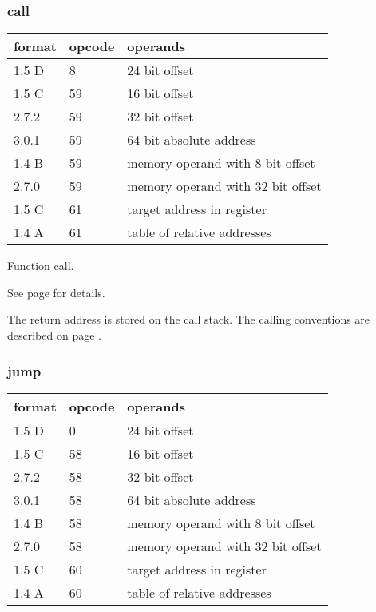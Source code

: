 \documentclass[forwardcom.tex]{subfiles}
\begin{document}
\subsubsection{call}
\label{table:callInstruction}
\begin{tabular}{|p{12mm}|p{12mm}|p{110mm}|}
\hline
\bfseries format & \bfseries opcode & \bfseries operands \\ \hline
1.5 D &  8 & 24 bit offset \\ \hline
1.5 C & 59 & 16 bit offset \\ \hline
2.7.2 & 59 & 32 bit offset \\ \hline
3.0.1 & 59 & 64 bit absolute address \\ \hline
1.4 B & 59 & memory operand with 8 bit offset \\ \hline
2.7.0 & 59 & memory operand with 32 bit offset \\ \hline
1.5 C & 61 & target address in register \\ \hline
1.4 A & 61 & table of relative addresses  \\ \hline
\end{tabular}
\vspace{2mm}

Function call.
\vspace{2mm}

See page \pageref{table:jumpInstructionFormats} for details.
\vspace{2mm}

The return address is stored on the call stack. The calling conventions are described on page \pageref{functionCallingConventions}.

\subsubsection{jump}
\label{table:jumpInstruction}
\begin{tabular}{|p{12mm}|p{12mm}|p{110mm}|}
\hline
\bfseries format & \bfseries opcode & \bfseries operands \\ \hline
1.5 D &  0 & 24 bit offset \\ \hline
1.5 C & 58 & 16 bit offset \\ \hline
2.7.2 & 58 & 32 bit offset \\ \hline
3.0.1 & 58 & 64 bit absolute address \\ \hline
1.4 B & 58 & memory operand with 8 bit offset \\ \hline
2.7.0 & 58 & memory operand with 32 bit offset \\ \hline
1.5 C & 60 & target address in register \\ \hline
1.4 A & 60 & table of relative addresses  \\ \hline
\end{tabular}
\vspace{2mm}
\end{document}
